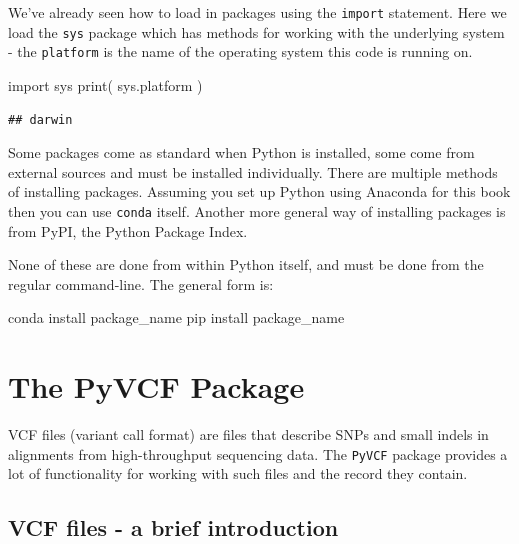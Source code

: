 \documentclass[]{book}
\newenvironment{Shaded}{\begin{snugshade}}{\end{snugshade}}
\newcommand{\BuiltInTok}[1]{#1}
\newcommand{\ExtensionTok}[1]{#1}
\newcommand{\ImportTok}[1]{#1}
\newcommand{\NormalTok}[1]{#1}
\theoremstyle{definition}
\theoremstyle{definition}
\theoremstyle{definition}
\theoremstyle{remark}
\begin{document}
We've already seen how to load in packages using the \texttt{import}
statement. Here we load the \texttt{sys} package which has methods for
working with the underlying system - the \texttt{platform} is the name
of the operating system this code is running on.

\begin{Shaded}
\begin{Highlighting}[]
\ImportTok{import}\NormalTok{ sys}
\BuiltInTok{print}\NormalTok{( sys.platform )}
\end{Highlighting}
\end{Shaded}

\begin{verbatim}
## darwin
\end{verbatim}

Some packages come as standard when Python is installed, some come from
external sources and must be installed individually. There are multiple
methods of installing packages. Assuming you set up Python using
Anaconda for this book then you can use \texttt{conda} itself. Another
more general way of installing packages is from PyPI, the Python Package
Index.

None of these are done from within Python itself, and must be done from
the regular command-line. The general form is:

\begin{Shaded}
\begin{Highlighting}[]
\ExtensionTok{conda}\NormalTok{ install package_name}
\ExtensionTok{pip}\NormalTok{ install package_name}
\end{Highlighting}
\end{Shaded}

\hypertarget{the-pyvcf-package}{%
\section{The PyVCF Package}\label{the-pyvcf-package}}

VCF files (variant call format) are files that describe SNPs and small
indels in alignments from high-throughput sequencing data. The
\texttt{PyVCF} package provides a lot of functionality for working with
such files and the record they contain.

\hypertarget{vcf-files---a-brief-introduction}{%
\subsection{VCF files - a brief
introduction}\label{vcf-files---a-brief-introduction}}
\end{document}
